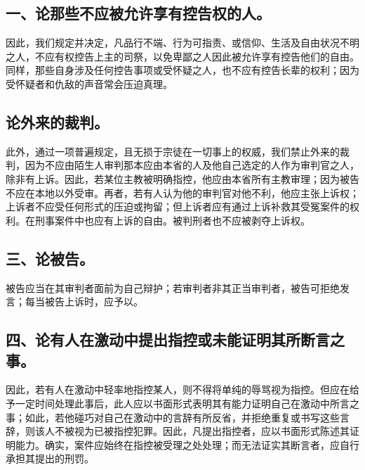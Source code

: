 
\subsection{一、论那些不应被允许享有控告权的人。}

因此，我们规定并决定，凡品行不端、行为可指责、或信仰、生活及自由状况不明之人，不应有权控告上主的司祭，以免卑鄙之人因此被允许享有控告他们的自由。同样，那些自身涉及任何控告事项或受怀疑之人，也不应有控告长辈的权利；因为受怀疑者和仇敌的声音常会压迫真理。\par


\subsection{论外来的裁判。}

此外，通过一项普遍规定，且无损于宗徒在一切事上的权威，我们禁止外来的裁判，因为不应由陌生人审判那本应由本省的人及他自己选定的人作为审判官之人，除非有上诉。因此，若某位主教被明确指控，他应由本省所有主教审理；因为被告不应在本地以外受审。再者，若有人认为他的审判官对他不利，他应主张上诉权；上诉者不应受任何形式的压迫或拘留；但上诉者应有通过上诉补救其受冤案件的权利。在刑事案件中也应有上诉的自由。被判刑者也不应被剥夺上诉权。\par


\subsection{三、论被告。}

被告应当在其审判者面前为自己辩护；若审判者非其正当审判者，被告可拒绝发言；每当被告上诉时，应予以。\par


\subsection{四、论有人在激动中提出指控或未能证明其所断言之事。}

因此，若有人在激动中轻率地指控某人，则不得将单纯的辱骂视为指控。但应在给予一定时间处理此事后，此人应以书面形式表明其有能力证明自己在激动中所言之事；如此，若他碰巧对自己在激动中的言辞有所反省，并拒绝重复或书写这些言辞，则该人不被视为已被指控犯罪。因此，凡提出指控者，应以书面形式陈述其证明能力。确实，案件应始终在指控被受理之处处理；而无法证实其断言者，应自行承担其提出的刑罚。\par

